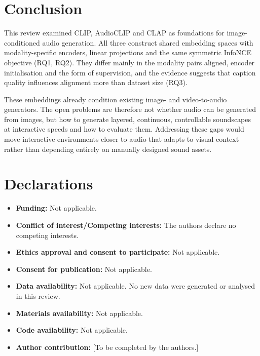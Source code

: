 \documentclass[pdflatex,sn-mathphys-num]{sn-jnl}%
\theoremstyle{thmstyleone}%
\theoremstyle{thmstyletwo}%
\theoremstyle{thmstylethree}%
\begin{document}
\section{Conclusion}\label{sec8}

This review examined CLIP, AudioCLIP and CLAP as foundations for image-conditioned audio generation. All three construct shared embedding spaces with modality-specific encoders, linear projections and the same symmetric InfoNCE objective (RQ1, RQ2). They differ mainly in the modality pairs aligned, encoder initialisation and the form of supervision, and the evidence suggests that caption quality influences alignment more than dataset size (RQ3).

These embeddings already condition existing image- and video-to-audio generators. The open problems are therefore not whether audio can be generated from images, but how to generate layered, continuous, controllable soundscapes at interactive speeds and how to evaluate them. Addressing these gaps would move interactive environments closer to audio that adapts to visual context rather than depending entirely on manually designed sound assets.


\section*{Declarations}


\begin{itemize}
\item \textbf{Funding:} Not applicable.
\item \textbf{Conflict of interest/Competing interests:} The authors declare no competing interests.
\item \textbf{Ethics approval and consent to participate:} Not applicable.
\item \textbf{Consent for publication:} Not applicable.
\item \textbf{Data availability:} Not applicable. No new data were generated or analysed in this review.
\item \textbf{Materials availability:} Not applicable.
\item \textbf{Code availability:} Not applicable.
\item \textbf{Author contribution:} [To be completed by the authors.]
\end{itemize}


\
% 

\end{document}
